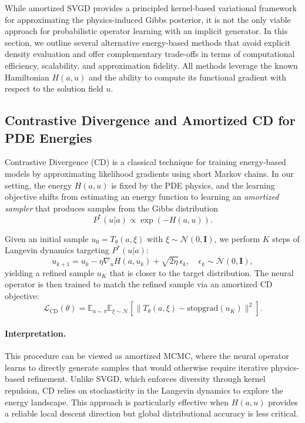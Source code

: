 \documentclass[11pt]{article}
\newcommand{\calN}{\mathcal{N}}
\newcommand{\calL}{\mathcal{L}}
\newcommand{\bbE}{\mathbb{E}}
\begin{document}
While amortized SVGD provides a principled kernel-based variational framework for approximating the physics-induced Gibbs posterior, it is not the only viable approach for probabilistic operator learning with an implicit generator. In this section, we outline several alternative energy-based methods that avoid explicit density evaluation and offer complementary trade-offs in terms of computational efficiency, scalability, and approximation fidelity. All methods leverage the known Hamiltonian $H(a,u)$ and the ability to compute its functional gradient with respect to the solution field $u$.

\subsection{Contrastive Divergence and Amortized CD for PDE Energies}

Contrastive Divergence (CD) is a classical technique for training energy-based models by approximating likelihood gradients using short Markov chains. In our setting, the energy $H(a,u)$ is fixed by the PDE physics, and the learning objective shifts from estimating an energy function to learning an \emph{amortized sampler} that produces samples from the Gibbs distribution
\begin{equation}
    P^*(u|a) \propto \exp(-H(a,u)).
\end{equation}

Given an initial sample $u_0 = T_\theta(a,\xi)$ with $\xi \sim \calN(0,\mathbf{I})$, we perform $K$ steps of Langevin dynamics targeting $P^*(u|a)$:
\begin{equation}
    u_{k+1} = u_k - \eta \nabla_u H(a, u_k) + \sqrt{2\eta}\,\epsilon_k,
    \quad \epsilon_k \sim \calN(0,\mathbf{I}),
\end{equation}
yielding a refined sample $u_K$ that is closer to the target distribution. The neural operator is then trained to match the refined sample via an amortized CD objective:
\begin{equation}
    \calL_{\text{CD}}(\theta)
    =
    \bbE_{a \sim \pi}\bbE_{\xi \sim \calN}
    \left[
        \|T_\theta(a,\xi) - \text{stopgrad}(u_K)\|^2
    \right].
\end{equation}

\paragraph{Interpretation.}
This procedure can be viewed as amortized MCMC, where the neural operator learns to directly generate samples that would otherwise require iterative physics-based refinement. Unlike SVGD, which enforces diversity through kernel repulsion, CD relies on stochasticity in the Langevin dynamics to explore the energy landscape. This approach is particularly effective when $H(a,u)$ provides a reliable local descent direction but global distributional accuracy is less critical.
\end{document}
